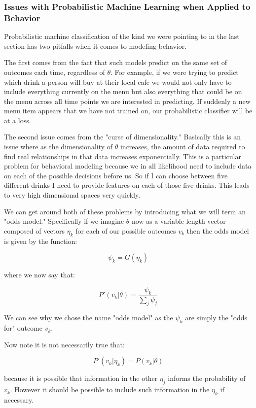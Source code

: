 \documentclass[11pt]{article}
\begin{document}
\subsubsection{Issues with Probabilistic Machine Learning when Applied to Behavior}

Probabilistic machine classification \cite{durr} of the kind we were pointing to in the last section has two pitfalls when it comes to modeling behavior. 

The first comes from the fact that such models predict on the same set of outcomes each time, regardless of $\theta$. For example, if we were trying to predict which drink a person will buy at their local cafe we would not only have to include everything currently on the menu but also everything that could be on the menu across all time points we are interested in predicting. If suddenly a new menu item appears that we have not trained on, our probabilistic classifier will be at a loss. 

The second issue comes from the "curse of dimensionality." Basically this is an issue where as the dimensionality of $\theta$ increases, the amount of data required to find real relationships in that data increases exponentially. This is a particular problem for behavioral modeling because we in all likelihood need to include data on each of the possible decisions before us. So if I can choose between five different drinks I need to provide features on each of those five drinks. This leads to very high dimensional spaces very quickly. \newline


We can get around both of these problems by introducing what we will term an "odds model." Specifically if we imagine $\theta$ now as a variable length vector composed of vectors $\eta_k$ for each of our possible outcomes $v_k$ then the odds model is given by the function:

$$\psi_k=G(\eta_k)$$

where we now say that:

$$P'(v_k|\theta) = \frac{\psi_k}{\sum_j \psi_j}$$

We can see why we chose the name "odds model" as the $\psi_k$ are simply the "odds for" outcome $v_k$. \newline

Now note it is not necessarily true that:

$$P'(v_k|\eta_k) = P(v_k|\theta)$$

because it is possible that information in the other $\eta_j$ informs the probability of $v_k$. However it should be possible to include such information in the $\eta_k$ if necessary. 
\end{document}

